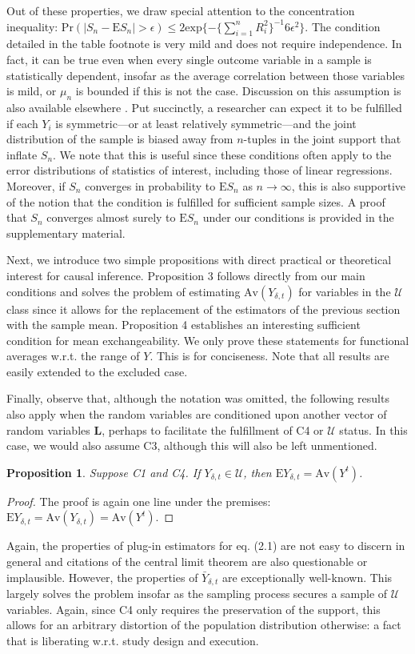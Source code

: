 \documentclass[12pt]{amsart}
\theoremstyle{plain}%
\newtheorem{proposition}{Proposition}
\theoremstyle{definition}
\theoremstyle{remark}
\numberwithin{equation}{section}
\begin{document}
Out of these properties, we draw special attention to the concentration inequality: $\text{Pr}(|S_n - \text{E}S_n| > \epsilon) \leq 2 \text{exp} \{ - \{ \sum_{i=1}^n R_i^2 \}^{-1} 6 \epsilon^2  \}$. The condition detailed in the table footnote is very mild and does not require independence. In fact, it can be true even when every single outcome variable in a sample is statistically dependent, insofar as the average correlation between those variables is mild, or $\mu_n$ is bounded if this is not the case. Discussion on this assumption is also available elsewhere \cite{u2023properties}.  Put succinctly, a researcher can expect it to be fulfilled if each $Y_i$ is symmetric---or at least relatively symmetric---and the joint distribution of the sample is biased away from $n$-tuples in the joint support that inflate $S_n$. We note that this is useful since these conditions often apply to the error distributions of statistics of interest, including those of linear regressions. Moreover, if $S_n$ converges in probability to $\text{E}S_n$ as $n \to \infty$, this is also supportive of the notion that the condition is fulfilled for sufficient sample sizes. A proof that $S_n$ converges almost surely to $\text{E}S_n$ under our conditions is provided in the supplementary material.

Next, we introduce two simple propositions with direct practical or theoretical interest for causal inference. Proposition 3 follows directly from our main conditions and solves the problem of estimating $\text{Av}(Y_{\delta, t})$ for variables in the $\mathcal{U}$ class since it allows for the replacement of the estimators of the previous section with the sample mean. Proposition 4 establishes an interesting sufficient condition for mean exchangeability. We only prove these statements for functional averages w.r.t. the range of $Y$. This is for conciseness. Note that all results are easily extended to the excluded case.

Finally, observe that, although the notation was omitted, the following results also apply when the random variables are conditioned upon another vector of random variables $\mathbf{L}$, perhaps to facilitate the fulfillment of C4 or $\mathcal{U}$ status. In this case, we would also assume C3, although this will also be left unmentioned.
\begin{proposition}
Suppose C1 and C4. If $Y_{\delta, t} \in \mathcal{U}$, then $\text{E}Y_{\delta, t} = \text{Av}(Y^t)$.
\end{proposition}
\begin{proof}
The proof is again one line under the premises: $\text{E}Y_{\delta, t} = \text{Av}(Y_{\delta, t}) = \text{Av}(Y^t)$.
\end{proof}
Again, the properties of plug-in estimators for eq. (2.1) are not easy to discern in general and citations of the central limit theorem are also questionable or implausible. However, the properties of $\bar{Y}_{\delta, t}$ are exceptionally well-known. This largely solves the problem insofar as the sampling process secures a sample of $\mathcal{U}$ variables. Again, since C4 only requires the preservation of the support, this allows for an arbitrary distortion of the population distribution otherwise: a fact that is liberating w.r.t. study design and execution.
\end{document}

